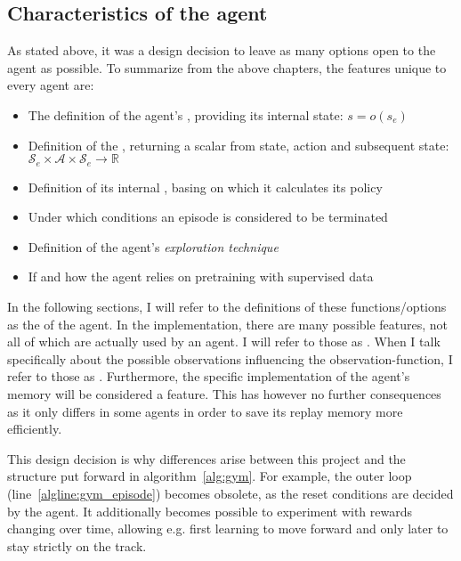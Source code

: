 \subsection{Characteristics of the agent}
\label{ch:agentchars}

As stated above, it was a design decision to leave as many options open to the agent as possible. To summarize from the above chapters, the features unique to every agent are:
\begin{itemize}
	\item The definition of the agent's , providing its internal state: $s = o(s_e)$
	\item Definition of the , returning a scalar from state, action and subsequent state: $\mathcal{S}_e \times \mathcal{A} \times \mathcal{S}_e \rightarrow \mathds{R}$
	\item Definition of its internal , basing on which it calculates its policy
	\item Under which conditions an episode is considered to be terminated 
	\item Definition of the agent's \textit{exploration technique}
	\item If and how the agent relies on pretraining with supervised data	
\end{itemize}
\begin{flushright}
	\scriptsize
	In the following sections, I will refer to the definitions of these functions/options as the  of the agent. In the implementation, there are many possible features, not all of which are actually used by an agent. I will refer to those as . When I talk specifically about the possible observations influencing the observation-function, I refer to those as . Furthermore, the specific implementation of the agent's memory will be considered a feature. This has however no further consequences as it only differs in some agents in order to save its replay memory more efficiently.
\end{flushright}

This design decision is why differences arise between this project and the structure put forward in algorithm~\ref{alg:gym}. For example, the outer loop (line~\ref{algline:gym_episode}) becomes obsolete, as the reset conditions are decided by the agent. It additionally becomes possible to experiment with rewards changing over time, allowing e.g. first learning to move forward and only later to stay strictly on the track.

